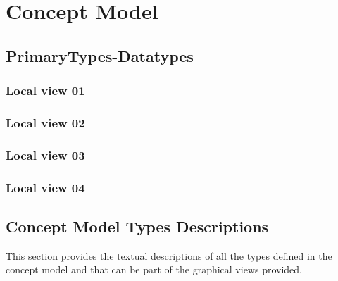 
\chapter{Concept Model}
\label{chap:lu.uni.lassy.excalibur.standard.specification.libraries-CM}




\section{PrimaryTypes-Datatypes}
\subsection{Local view 01}
\label{sec:lu.uni.lassy.excalibur.standard.specification.libraries-CM-view-local-PrimaryTypes-Datatypes-01}

\subsection{Local view 02}
\label{sec:lu.uni.lassy.excalibur.standard.specification.libraries-CM-view-local-PrimaryTypes-Datatypes-02}

\subsection{Local view 03}
\label{sec:lu.uni.lassy.excalibur.standard.specification.libraries-CM-view-local-PrimaryTypes-Datatypes-03}

\subsection{Local view 04}
\label{sec:lu.uni.lassy.excalibur.standard.specification.libraries-CM-view-local-PrimaryTypes-Datatypes-04}










\section{Concept Model Types Descriptions}
This section provides the textual descriptions of all the types defined in the concept model and that can be part of the graphical views provided.

